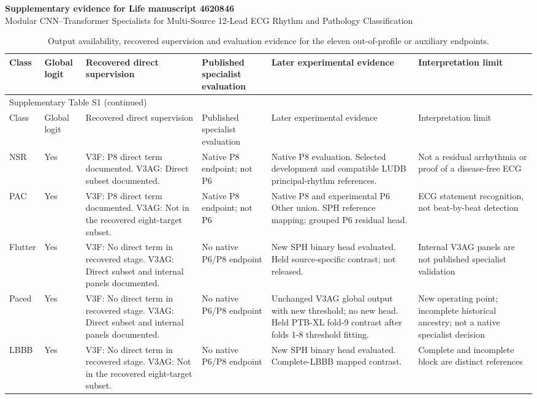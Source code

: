 \documentclass[10pt,a4paper,landscape]{article}
\begin{document}
\textbf{Supplementary evidence for Life manuscript 4620846}\\
Modular CNN--Transformer Specialists for Multi-Source 12-Lead ECG Rhythm and Pathology Classification

\small
\begin{longtable}{@{}p{.045\linewidth}p{.035\linewidth}p{.285\linewidth}p{.14\linewidth}p{.25\linewidth}p{.17\linewidth}@{}}
\caption{Output availability, recovered supervision and evaluation evidence for the eleven out-of-profile or auxiliary endpoints.}\label{tab:S1}\\
\toprule
Class & Global logit & Recovered direct supervision & Published specialist evaluation & Later experimental evidence & Interpretation limit\\
\midrule\endfirsthead
\multicolumn{6}{l}{Supplementary Table S1 (continued)}\\
\toprule
Class & Global logit & Recovered direct supervision & Published specialist evaluation & Later experimental evidence & Interpretation limit\\
\midrule\endhead
\bottomrule\endfoot
NSR & Yes & V3F: P8 direct term documented. V3AG: Direct subset documented. & Native P8 endpoint; not P6 & Native P8 evaluation. Selected development and compatible LUDB principal-rhythm references. & Not a residual arrhythmia or proof of a disease-free ECG \\
PAC & Yes & V3F: P8 direct term documented. V3AG: Not in the recovered eight-target subset. & Native P8 endpoint; not P6 & Native P8 and experimental P6 Other union. SPH reference mapping; grouped P6 residual head. & ECG statement recognition, not beat-by-beat detection \\
Flutter & Yes & V3F: No direct term in recovered stage. V3AG: Direct subset and internal panels documented. & No native P6/P8 endpoint & New SPH binary head evaluated. Held source-specific contrast; not released. & Internal V3AG panels are not published specialist validation \\
Paced & Yes & V3F: No direct term in recovered stage. V3AG: Direct subset and internal panels documented. & No native P6/P8 endpoint & Unchanged V3AG global output with new threshold; no new head. Held PTB-XL fold-9 contrast after folds 1-8 threshold fitting. & New operating point; incomplete historical ancestry; not a native specialist decision \\
LBBB & Yes & V3F: No direct term in recovered stage. V3AG: Not in the recovered eight-target subset. & No native P6/P8 endpoint & New SPH binary head evaluated. Complete-LBBB mapped contrast. & Complete and incomplete block are distinct references \\

\end{longtable}
\end{document}
